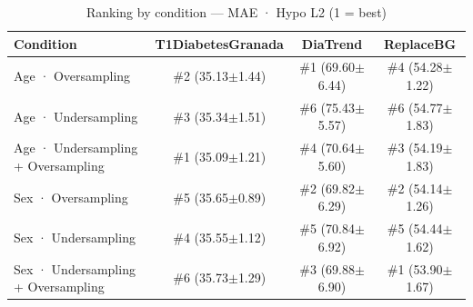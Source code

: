 \begin{table}[htbp]
\centering
\small
\caption{Ranking by condition — MAE · Hypo L2  (1 = best)}
\label{tab:ranking_mae_tbr_2_family_mechanism_random}
\begin{tabular}{lccc}
\toprule
\textbf{Condition} & \textbf{T1DiabetesGranada} & \textbf{DiaTrend} & \textbf{ReplaceBG} \\
\midrule
Age · Oversampling & \#2 (35.13$\pm$1.44) & \#1 (69.60$\pm$6.44) & \#4 (54.28$\pm$1.22) \\
Age · Undersampling & \#3 (35.34$\pm$1.51) & \#6 (75.43$\pm$5.57) & \#6 (54.77$\pm$1.83) \\
Age · Undersampling + Oversampling & \#1 (35.09$\pm$1.21) & \#4 (70.64$\pm$5.60) & \#3 (54.19$\pm$1.83) \\
\midrule
Sex · Oversampling & \#5 (35.65$\pm$0.89) & \#2 (69.82$\pm$6.29) & \#2 (54.14$\pm$1.26) \\
Sex · Undersampling & \#4 (35.55$\pm$1.12) & \#5 (70.84$\pm$6.92) & \#5 (54.44$\pm$1.62) \\
Sex · Undersampling + Oversampling & \#6 (35.73$\pm$1.29) & \#3 (69.88$\pm$6.90) & \#1 (53.90$\pm$1.67) \\
\bottomrule
\end{tabular}
\end{table}